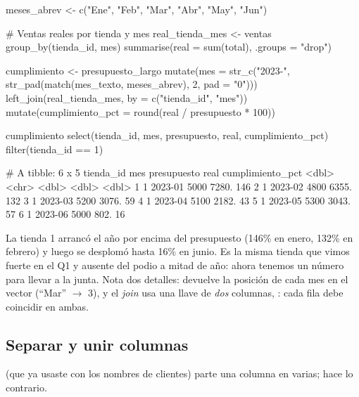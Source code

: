 \begin{rcode}
meses_abrev <- c("Ene", "Feb", "Mar", "Abr", "May", "Jun")

# Ventas reales por tienda y mes
real_tienda_mes <- ventas %
  group_by(tienda_id, mes) %
  summarise(real = sum(total), .groups = "drop")

cumplimiento <- presupuesto_largo %
  mutate(mes = str_c("2023-", str_pad(match(mes_texto, meses_abrev),
                                      2, pad = "0"))) %
  left_join(real_tienda_mes,
            by = c("tienda_id", "mes")) %
  mutate(cumplimiento_pct = round(real / presupuesto * 100))

cumplimiento %
  select(tienda_id, mes, presupuesto, real, cumplimiento_pct) %
  filter(tienda_id == 1)
\end{rcode}
\begin{rsalida}
# A tibble: 6 x 5
  tienda_id mes     presupuesto  real cumplimiento_pct
      <dbl> <chr>         <dbl> <dbl>            <dbl>
1         1 2023-01        5000 7280.              146
2         1 2023-02        4800 6355.              132
3         1 2023-03        5200 3076.               59
4         1 2023-04        5100 2182.               43
5         1 2023-05        5300 3043.               57
6         1 2023-06        5000  802.               16
\end{rsalida}

La tienda 1 arrancó el año por encima del presupuesto (146\% en enero, 132\%
en febrero) y luego se desplomó hasta 16\% en junio. Es la misma tienda que
vimos fuerte en el Q1 y ausente del podio a mitad de año: ahora tenemos un
número para llevar a la junta. Nota dos detalles:  devuelve la posición de cada mes en el vector
 (``Mar'' $\rightarrow$ 3), y el \emph{join} usa una
llave de \emph{dos} columnas, : cada fila
debe coincidir en ambas.

\subsection{Separar y unir columnas}

 (que ya usaste con los nombres de
clientes) parte una columna en varias;  hace lo contrario.


